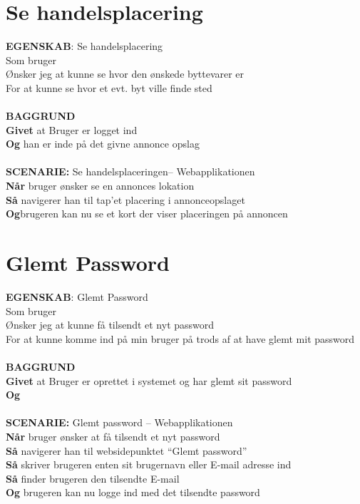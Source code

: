 \section{Se handelsplacering}
{\color{blue}\textbf{EGENSKAB}:} Se handelsplacering \\
Som bruger \\
Ønsker jeg at kunne se hvor den ønskede byttevarer er \\
For at kunne se hvor et evt. byt ville finde sted\\ \\
{\color{blue}\textbf{BAGGRUND}} \\
{\color{blue}\textbf{Givet}} at Bruger er logget ind \\
{\color{blue}\textbf{Og}} han er inde på det givne annonce opslag\\\\
{\color{blue}\textbf{SCENARIE:}} Se handelsplaceringen– Webapplikationen \\
{\color{blue}\textbf{Når}} bruger ønsker se en annonces lokation \\
{\color{blue}\textbf{Så}} navigerer han til tap’et placering i annonceopslaget \\
{\color{blue}\textbf{Og}}brugeren kan nu se et kort der viser placeringen på annoncen

\section{Glemt Password}
{\color{blue}\textbf{EGENSKAB}:} Glemt Password \\
Som bruger \\
Ønsker jeg at kunne få tilsendt et nyt password \\
For at kunne komme ind på min bruger på trods af at have glemt mit password\\ \\
{\color{blue}\textbf{BAGGRUND}} \\
{\color{blue}\textbf{Givet}} at Bruger er oprettet i systemet og har glemt sit password \\
{\color{blue}\textbf{Og}} \\\\
{\color{blue}\textbf{SCENARIE:}} Glemt password – Webapplikationen \\
{\color{blue}\textbf{Når}} bruger ønsker at få tilsendt et nyt password \\
{\color{blue}\textbf{Så}} navigerer han til websidepunktet  “Glemt password” \\
{\color{blue}\textbf{Så}} skriver brugeren enten sit brugernavn eller E-mail adresse ind\\
{\color{blue}\textbf{Så}} finder brugeren den tilsendte E-mail \\
{\color{blue}\textbf{Og}} brugeren kan nu logge ind med det tilsendte password

